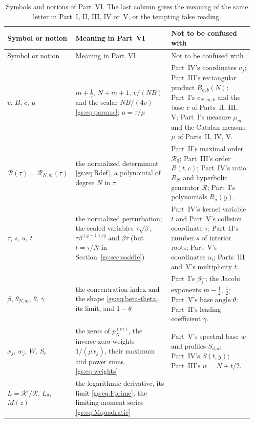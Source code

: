 \documentclass[11pt,a4paper]{article}
\numberwithin{equation}{section}
\theoremstyle{definition}
\theoremstyle{remark}
\newcommand{\Rzero}{\mathcal R_0}
\newcommand{\Rgs}{\mathcal R}
\begin{document}
\begingroup\small
\renewcommand{\arraystretch}{1.15}
\begin{longtable}{@{}>{\raggedright}p{}>{\raggedright}p{}>{\raggedright\arraybackslash}p{}@{}}
\caption{Symbols and notions of Part~VI.  The last column gives the
meaning of the same letter in Part~I, II, III, IV or~V, or the tempting
false reading.}\label{gs:tab:notation}\\
\toprule
Symbol or notion & Meaning in Part~VI & Not to be confused with\\
\midrule
\endfirsthead
\toprule
Symbol or notion & Meaning in Part~VI & Not to be confused with\\
\midrule
\endhead
\bottomrule
\endfoot
$v$, $B$, $c$, $\mu$
 & $m+\frac12$, $N+m+1$, $v/(NB)$ and the scalar $NB/(4v)$
   \eqref{gs:eq:params}; $a=\tau/\mu$
 & Part~IV's coordinates $v_j$; Part~III's rectangular product
   $B_{a,b}(N)$; Part~I's $c_{N,m,k}$ and the base $c$ of Parts~II, III, V;
   Part~I's measure $\mu_m$ and the Catalan measure $\mu$ of Parts~II, IV, V.\\
$\Rgs(\tau)=\Rgs_{N,m}(\tau)$
 & the normalized determinant \eqref{gs:eq:Rdef}, a polynomial of degree
   $N$ in $\tau$
 & Part~II's maximal order $\Rzero$; Part~III's order $R(t,c)$; Part~IV's
   ratio $R_N$ and hyperbolic generator $\mathcal R$; Part~I's
   polynomials $R_n(y)$.\\
$\tau$, $s$, $u$, $t$
 & the normalized perturbation; the scaled variables $\tau\sqrt\beta$,
   $\tau\beta^{(q-1)/q}$ and $\beta\tau$ (but $t=\tau/N$ in
   Section~\ref{gs:sec:saddle})
 & Part~IV's kernel variable $t$ and Part~V's collision coordinate $\tau$;
   Part~II's number $s$ of interior roots; Part~V's coordinates $u_i$;
   Parts~III and~V's multiplicity $t$.\\
$\beta$, $\theta_{N,m}$, $\theta$, $\gamma$
 & the concentration index and the shape \eqref{gs:eq:beta-theta}, its
   limit, and $1-\theta$
 & Part~I's $\beta_j^\pm$; the Jacobi exponents $m-\frac12$, $\frac12$;
   Part~V's base angle $\theta$; Part~II's leading coefficient $\gamma$.\\
$x_j$, $w_j$, $W$, $S_r$
 & the zeros of $p_N^{(m)}$, the inverse-zero weights $1/(\mu x_j)$, their
   maximum and power sums \eqref{gs:eq:weights}
 & Part~V's spectral base $w$ and profiles $S_{d,k}$; Part~IV's
   $S(t,y)$; Part~III's $w=N+t/2$.\\
$L=\Rgs'/\Rgs$, $L_\theta$, $M(z)$
 & the logarithmic derivative, its limit \eqref{gs:eq:Fprime}, the limiting
   moment series \eqref{gs:eq:Mquadratic}

\end{longtable}
\end{document}
